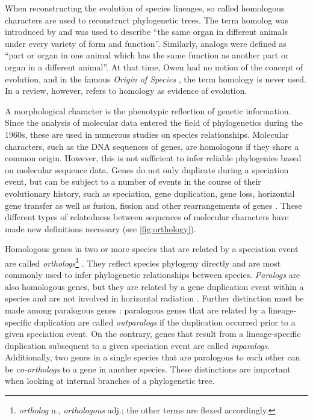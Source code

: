 When reconstructing the evolution of species lineages, so called homologous
characters are used to reconstruct phylogenetic trees. The term homolog was
introduced by \citet{owen1848} and was used to describe ``the same organ in
different animals under every variety of form and function''. Similarly,
analogs were defined as ``part or organ in one animal which has the same
function as another part or organ in a different animal''. At that time, Owen
had no notion of the concept of evolution, and in the famous \emph{Origin of
Species} \citep{darwin1859}, the term homology is never used. In a review,
however, \citet{owen1860} refers to homology as evidence of evolution.

A morphological character is the phenotypic reflection of genetic information.
Since the analysis of molecular data entered the field of phylogenetics during
the 1960s, these are used in numerous studies on species relationships.
Molecular characters, such as the DNA sequences of genes, are homologous if they
share a common origin. However, this is not sufficient to infer reliable
phylogenies based on molecular sequence data. Genes do not only duplicate during
a speciation event, but can be subject to a number of events in the course of
their evolutionary history, such as speciation, gene duplication, gene loss,
horizontal gene transfer as well as fusion, fission and other rearrangements of
genes \citep{koonin2005}.  These different types of relatedness between
sequences of molecular characters have made new definitions necessary (see
\autoref{fig:orthology}).



Homologous genes in two or more species that are related by a speciation event
are called \emph{orthologs}\footnote{\emph{ortholog} n., \emph{orthologous}
adj.; the other terms are flexed accordingly.} \citep{fitch1970}. They reflect
species phylogeny directly and are most commonly used to infer phylogenetic
relationships between species. \emph{Paralogs} are also homologous genes, but
they are related by a gene duplication event within a species and are not
involved in horizontal radiation \citep{ohno1970}. Further distinction must be
made among paralogous genes \citep{remm2001}: paralogous genes that are related
by a lineage-specific duplication are called \emph{outparalogs} if the
duplication occurred prior to a given speciation event. On the contrary, genes
that result from a lineage-specific duplication subsequent to a given speciation
event are called \emph{inparalogs}. Additionally, two genes in a single species
that are paralogous to each other can be \emph{co-orthologs} to a gene in
another species. These distinctions are important when looking at internal
branches of a phylogenetic tree. 

